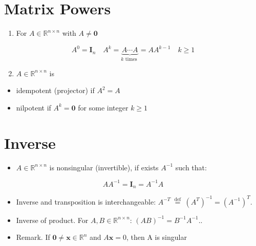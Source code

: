 \documentclass[11pt]{book}
\begin{document}
\section*{Matrix Powers}
\begin{enumerate}
  \item For $A \in \mathbb{R}^{n \times n}$ with $A \neq \mathbf{0}$
\end{enumerate}

$$
A^{0}=\mathbf{I}_{n} \quad A^{k}=\underbrace{A \cdots A}_{k \text { times }}=A A^{k-1} \quad k \geq 1
$$

\begin{enumerate}
  \setcounter{enumi}{1}
  \item $A \in \mathbb{R}^{n \times n}$ is
\end{enumerate}

\begin{itemize}
  \item idempotent (projector) if $A^{2}=A$

  \item nilpotent if $A^{k}=\mathbf{0}$ for some integer $k \geq 1$

\end{itemize}

\section*{Inverse}
\begin{itemize}
  \item $A \in \mathbb{R}^{n \times n}$ is nonsingular (invertible), if exists $A^{-1}$ such that:
\end{itemize}

$$
A A^{-1}=\mathbf{I}_{n}=A^{-1} A
$$

\begin{itemize}
  \item Inverse and transposition is interchangeable: $
A^{-T} \stackrel{\text { def }}{=}\left(A^{T}\right)^{-1}=\left(A^{-1}\right)^{T}
$.
\end{itemize}



\begin{itemize}
  \item Inverse of product. For $A, B \in \mathbb{R}^{n \times n}$: $
(A B)^{-1}=B^{-1} A^{-1}.
$.
\end{itemize}



\begin{itemize}
  \item Remark. If $\mathbf{0} \neq \mathbf{x} \in \mathbb{R}^{n}$ and $A \mathbf{x}=0$, then $\mathrm{A}$ is singular
\end{itemize}
\end{document}
